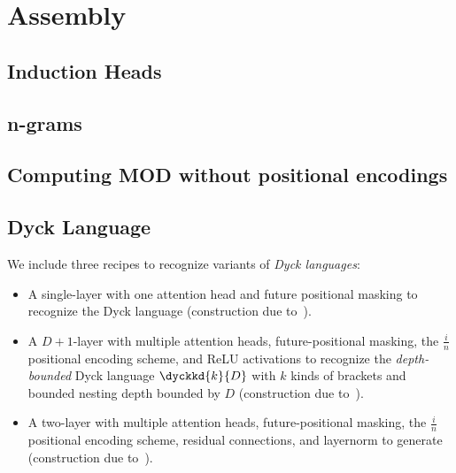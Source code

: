 %
\chapter{Assembly}
%



\section{Induction Heads}


\section{n-grams}


\section{Computing MOD without positional encodings}


\section{Dyck Language}
We include three recipes to recognize variants of \textit{Dyck languages}:\begin{itemize}
    \item A single-layer \SMAT{} with one attention head and future positional masking to recognize the Dyck language  (construction due to~\citet{bhattamishra2020ability}).
    \item A $D{+}1$-layer \UHAT{} with multiple attention heads, future-positional masking, the $\frac{i}{n}$ positional encoding scheme, and ReLU activations to recognize the \textit{depth-bounded} Dyck language $\dyckkd{k}{D}$ with $k$ kinds of brackets and bounded nesting depth bounded by $D$ (construction due to~\citet{yao-2021-self-attention}).
    \item A two-layer \SMAT{} with multiple attention heads, future-positional masking, the $\frac{i}{n}$ positional encoding scheme, residual connections, and layernorm to generate  (construction due to~\citet{yao-2021-self-attention}). 
\end{itemize}

